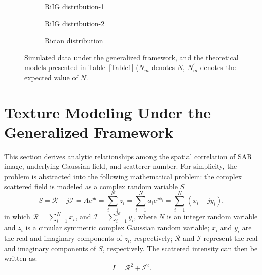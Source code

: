 \documentclass[journal]{IEEEtran}
\begin{document}
\begin{figure*}[htb]
\begin{subfigure}[t]{4.2cm}
	\caption{RiIG distribution-1}\label{Figure5(i)}
\end{subfigure}
\begin{subfigure}[t]{4.2cm}
	\centering
	\caption{RiIG distribution-2}\label{Figure5(j)}
\end{subfigure}
\begin{subfigure}[t]{4.2cm}
	\centering
	\caption{Rician distribution}\label{Figure5(k)}
\end{subfigure}
\caption{Simulated data under the generalized framework, and the theoretical models presented in Table~\ref{Table1} ($N_{m}$ denotes $\overline{N}$, $N_{m}^{\prime}$ denotes the expected value of $\overline{N}$.}\label{Figure5}
\end{figure*}

\section{Texture Modeling Under the Generalized Framework}\label{Sec:Texture}

This section derives analytic relationships among the spatial correlation of SAR image, underlying Gaussian field, and scatterer number.
For simplicity, the problem is abstracted into the following mathematical problem:
the complex scattered field is modeled as a complex random variable $S$
\begin{equation}
S  = \mathcal{R}+j \mathcal{I}=A e^{j \theta}=\sum_{i=1}^{N} z_{i}
=\sum_{i=1}^{N} a_{i} e^{j \phi_{i}}=\sum_{i=1}^{N}\left(x_{i}+j y_{i}\right),
\label{eq14}
\end{equation}
in which $\mathcal{R}=\sum_{i=1}^{N} x_{i}$, and $\mathcal{I}=\sum_{i=1}^{N} y_{i}$,
where $N$ is an integer random variable and $z_i$ is a circular symmetric complex Gaussian random variable;
$x_i$ and $y_i$ are the real and imaginary components of $z_i$, respectively;
$\mathcal{R}$ and $\mathcal{I}$ represent the real and imaginary components of $S$, respectively.
The scattered intensity can then be written as:
\begin{equation}
I=\mathcal{R}^{2}+\mathcal{I}^{2}.
\label{eq15}
\end{equation}
\end{document}
